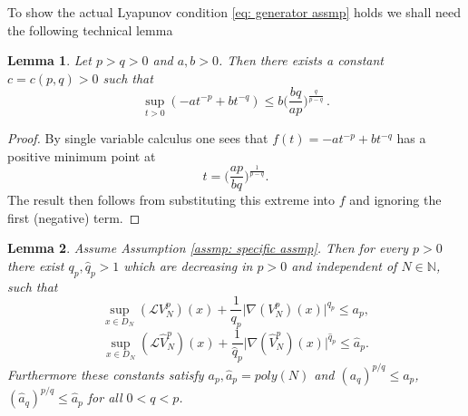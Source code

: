 \documentclass{article}
\newtheorem{lemma}{Lemma}
\begin{document}
To show the actual Lyapunov condition \eqref{eq: generator assmp} holds we shall need the following technical lemma
\begin{lemma}\label{lem: maximum of poly}
    Let $p>q>0$ and $a,b>0$. Then there exists a constant $c=c(p,q)>0$ such that
    \begin{equation}
        \sup_{t>0}(-at^{-p}+bt^{-q})\leq b\biggr (\frac{bq}{ap}\biggr)^{\frac{q}{p-q}}\,.
    \end{equation}
\end{lemma}
\begin{proof}
    By single variable calculus one sees that $f(t)=-at^{-p}+bt^{-q}$ has a positive minimum point at
    \begin{equation}
        t=\biggr(\frac{ap}{bq}\biggr)^{\frac{1}{p-q}}.
    \end{equation}
    The result then follows from substituting this extreme into $f$ and ignoring the first (negative) term.
\end{proof}
\begin{lemma}\label{lem: assump for interacting particles}
    Assume Assumption \ref{assmp: specific assmp}. Then for every $p>0$ there exist $q_p,\hat{q}_p>1$ which are decreasing in $p>0$ and independent of $N\in \mathbb{N}$, such that
    \begin{equation}
     \sup_{x\in D_N} ( \mathcal{L} V_N^p)(x)+\frac{1}{q_p}\lvert \nabla (V_N^p)(x)\rvert^{q_p}\leq a_p,
\end{equation}
    \begin{equation}
     \sup_{x\in D_N} ( \mathcal{L} \hat{V}_N^p)(x)+\frac{1}{\hat{q}_p}\lvert \nabla (\hat{V}_N^p)(x)\rvert^{\hat{q}_p}\leq \hat{a}_p.
\end{equation}
Furthermore these constants satisfy $a_p,\hat{a}_p=poly(N)$ and $(a_q)^{p/q}\leq a_p$, $(\hat{a}_q)^{p/q}\leq \hat{a}_p$ for all $0<q<p$.
\end{lemma}
\end{document}
